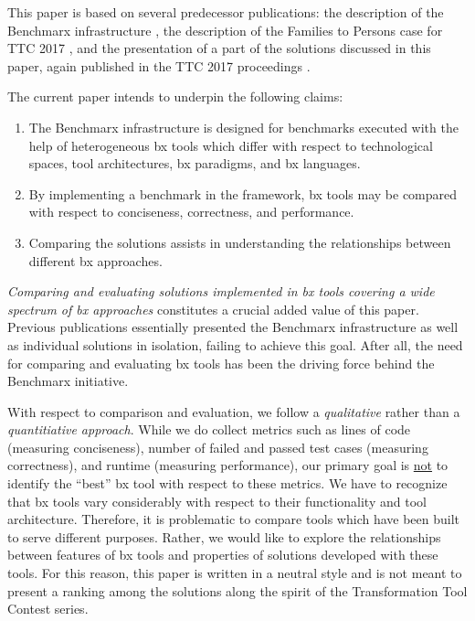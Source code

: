 This paper is based on several predecessor publications: the description of the Benchmarx infrastructure \cite{Anjorin2017}, the description of the Families to Persons case for TTC 2017 \cite{Anjorin2017a}, and the presentation of a part of the solutions discussed in this paper, again published in the TTC 2017 proceedings \cite{Samimi-Dehkordi2017,Zundorf2017,Hinkel2017}. 

The current paper intends to underpin the following claims:

\begin{enumerate}
	\item The Benchmarx infrastructure is designed for benchmarks executed with the help of  heterogeneous bx tools which differ with respect to technological spaces, tool architectures, bx paradigms, and bx languages.
	\item By implementing a benchmark in the framework, bx tools may be compared with respect to conciseness, correctness, and performance. 
	\item Comparing the solutions assists in understanding the relationships between different bx approaches.
\end{enumerate}

\emph{Comparing and evaluating solutions implemented in bx tools covering a wide spectrum of bx approaches} constitutes a crucial added value of this paper. Previous publications essentially presented the Benchmarx infrastructure as well as individual solutions in isolation, failing to achieve this goal. After all, the need for comparing and evaluating bx tools has been the driving force behind the Benchmarx initiative.

With respect to comparison and evaluation, we follow a \emph{qualitative} rather than a \emph{quantitiative approach}. While we do collect metrics such as lines of code (measuring conciseness), number of failed and passed test cases (measuring correctness), and runtime (measuring performance), our primary goal is \underline{not} to identify the ``best'' bx tool with respect to these metrics. We have to recognize that bx tools vary considerably with respect to their functionality and tool architecture. Therefore, it is problematic to compare tools which have been built to serve different purposes. Rather, we would like to explore the relationships between features of bx tools and properties of solutions developed with these tools. 
%
For this reason, this paper is written in a neutral style and is not meant to present a ranking among the solutions along the spirit of the Transformation Tool Contest series. 

